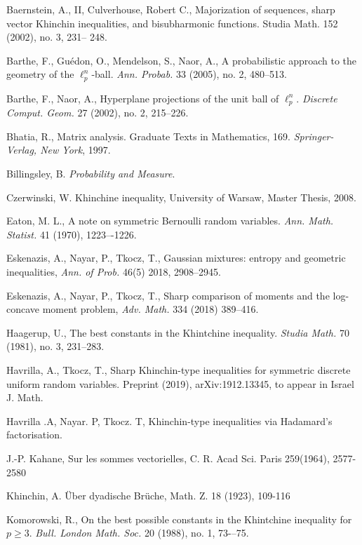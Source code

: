 \documentclass[10pt]{article}
\newcommand{\1}{\textbf{1}}
\theoremstyle{remark}
\theoremstyle{definition}
\begin{document}
\begin{thebibliography}{9}

 Baernstein, A., II, Culverhouse, Robert C., Majorization of sequences, sharp vector
Khinchin inequalities, and bisubharmonic functions. Studia Math. 152 (2002), no. 3, 231–
248.

 Barthe, F., Gu\'edon, O., Mendelson, S., Naor, A.,
A probabilistic approach to the geometry of the $\ell_p^n$-ball. 
\emph{Ann. Probab.} 33 (2005), no. 2, 480--513. 

 Barthe, F., Naor, A.,
Hyperplane projections of the unit ball of $\ell_p^n$. 
\emph{Discrete Comput. Geom.} 27 (2002), no. 2, 215--226. 

Bhatia, R.,
Matrix analysis. 
Graduate Texts in Mathematics, 169. \emph{Springer-Verlag, New York}, 1997.

 Billingsley, B. \textit{Probability and Measure}. 

 Czerwinski, W. Khinchine inequality, University of Warsaw, Master Thesis, 2008.

 Eaton, M. L.,
A note on symmetric Bernoulli random variables.
\emph{Ann. Math. Statist.} 41 (1970), 1223–-1226. 

 Eskenazis, A., Nayar, P., Tkocz, T.,
Gaussian mixtures: entropy and geometric inequalities, \emph{Ann. of Prob.} 46(5) 2018, 2908--2945.

 Eskenazis, A., Nayar, P., Tkocz, T.,
Sharp comparison of moments and the log-concave moment problem, \emph{Adv. Math.} 334 (2018) 389--416.

 Haagerup, U.,
The best constants in the Khintchine inequality.
\emph{Studia Math.} 70 (1981), no. 3, 231--283.

 Havrilla, A., Tkocz, T.,
Sharp Khinchin-type inequalities for symmetric discrete uniform random variables. Preprint (2019), arXiv:1912.13345, to appear in Israel J. Math.

 Havrilla .A, Nayar. P, Tkocz. T, Khinchin-type inequalities via Hadamard's factorisation.

 J.-P. Kahane, Sur les sommes vectorielles, C. R. Acad Sci. Paris 259(1964), 2577-2580

 Khinchin, A. {\"U}ber dyadische Br{\"u}che, Math. Z. 18 (1923), 109-116

 Komorowski, R.,
On the best possible constants in the Khintchine inequality for $p\geq3$.
\emph{Bull. London Math. Soc.} 20 (1988), no. 1, 73-–75. 


\end{thebibliography}
\end{document}
